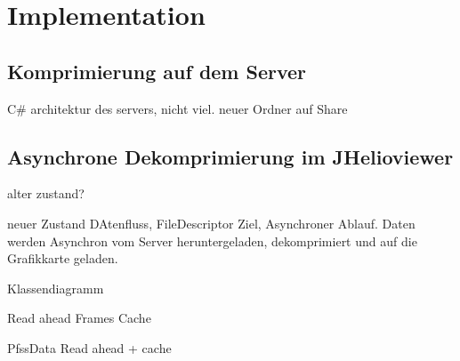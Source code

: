 \section{Implementation}

\subsection{Komprimierung auf dem Server}
C\# architektur des servers, nicht viel.
neuer Ordner auf Share


\subsection{Asynchrone Dekomprimierung im JHelioviewer}
alter zustand?

neuer Zustand
DAtenfluss, FileDescriptor
Ziel, Asynchroner Ablauf. Daten werden Asynchron vom Server heruntergeladen, dekomprimiert und auf die Grafikkarte geladen.

Klassendiagramm

Read ahead Frames
Cache

PfssData Read ahead + cache

